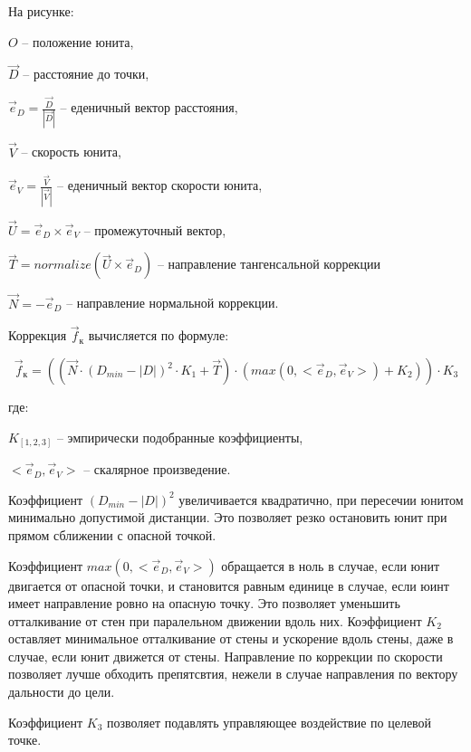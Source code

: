На рисунке:

$O$ -- положение юнита,

$\vec D$ -- расстояние до точки,

$\vec e_D = \frac{\vec D}{|\vec D|}$ -- еденичный вектор расстояния,

$\vec V$ -- скорость юнита,

$\vec e_V = \frac{\vec V}{|\vec V|}$ -- еденичный вектор скорости юнита,

$\vec U = \vec e_D \times \vec e_V$ -- промежуточный вектор,

$\vec T = normalize(\vec U \times \vec e_D)$ -- направление тангенсальной коррекции

$\vec N = -\vec e_D$ -- направление нормальной коррекции.

\newpage
Коррекция $\vec f_{\text{к}}$ вычисляется по формуле:

$$\vec f_{\text{к}} = ( ( \vec N \cdot ( D_{min} - |D| )^2 \cdot K_1 + \vec T ) \cdot ( max( 0, < \vec e_D, \vec e_V > ) + K_2 ) ) \cdot K_3 $$

где:

$K_{[1,2,3]}$ -- эмпирически подобранные коэффициенты, 

$< \vec e_D, \vec e_V >$ -- скалярное произведение.

Коэффициент $(D_{min} - |D|)^2$ увеличивается квадратично,
при пересечии юнитом минимально допустимой дистанции. Это позволяет
резко остановить юнит при прямом сближении с опасной точкой.

Коэффициент $max(0, < \vec e_D, \vec e_V > )$ обращается в ноль в случае,
если юнит двигается от опасной точки, и становится равным единице в случае,
если юинт имеет направление ровно на опасную точку. Это позволяет уменьшить
отталкивание от стен при паралельном движении вдоль них. Коэффициент $K_2$ оставляет
минимальное отталкивание от стены и ускорение вдоль стены, даже в случае, если
юнит движется от стены. Направление по коррекции по скорости позволяет лучше
обходить препятсвтия, нежели в случае направления по вектору дальности до цели.

Коэффициент $K_3$ позволяет подавлять управляющее воздействие по целевой \lb точке.
